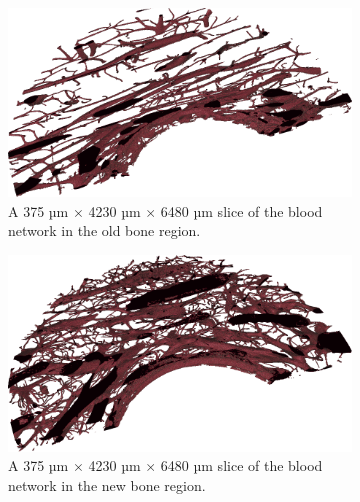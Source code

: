 \begin{figure}
    \centering
    \begin{subfigure}[b]{\linewidth}
    \centering
        \includegraphics[width=.7\linewidth]{generated/figure10_old_bone.png}
        \caption{A 375 µm $\times$ 4230 µm $\times$ 6480 µm slice of the blood network in the old bone region.}
        \label{fig:blood-old-slice}
    \end{subfigure}
    \begin{subfigure}[b]{\linewidth}
    \centering
        \includegraphics[width=.7\linewidth]{generated/figure10_new_bone.png}
        \caption{A 375 µm $\times$ 4230 µm $\times$ 6480 µm slice of the blood network in the new bone region.}
        \label{fig:blood-new-slice}
    \end{subfigure}
    \begin{subfigure}[b]{.48\linewidth}
    \centering

\end{subfigure}
\end{figure}
